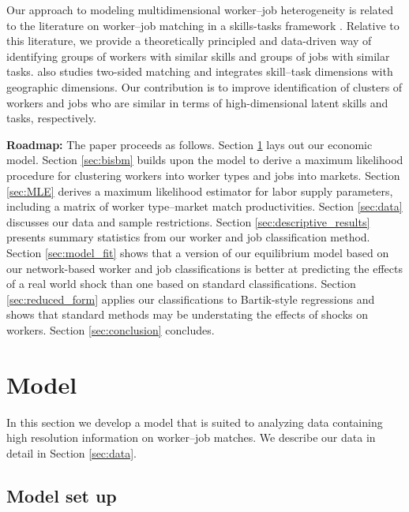 \documentclass[12pt]{article}
\theoremstyle{definition}
\theoremstyle{plain}
\begin{document}
Our approach to modeling multidimensional worker--job heterogeneity is related to the literature on worker--job matching in a skills-tasks framework \citep{AutorLevyMurnane2003,AcemogluAutor2011,Autor2013,Lindenlaub2017,Tan2018,Kantenga2018}. Relative to this literature, we provide a theoretically principled and data-driven way of identifying groups of workers with similar skills and groups of jobs with similar tasks. \citet{Mansfield2019} also studies two-sided matching and integrates skill--task dimensions with geographic dimensions.  Our contribution is to improve identification of clusters of workers and jobs who are similar in terms of high-dimensional latent skills and tasks, respectively.

\textbf{Roadmap:} The paper proceeds as follows.  Section \ref{sec:model} lays out our economic model. Section \ref{sec:bisbm} builds upon the model to derive a maximum likelihood procedure for clustering workers into worker types and jobs into markets. Section \ref{sec:MLE} derives a maximum likelihood estimator for labor supply parameters, including a matrix of worker type--market match productivities. Section \ref{sec:data} discusses our data and sample restrictions. Section \ref{sec:descriptive_results} presents summary statistics from our worker and job classification method. Section \ref{sec:model_fit} shows that a version of our equilibrium model based on our network-based worker and job classifications is better at predicting the effects of a real world shock than one based on standard classifications. Section \ref{sec:reduced_form} applies our classifications to Bartik-style regressions and shows that standard methods may be understating the effects of shocks on workers. Section \ref{sec:conclusion} concludes.




\section{Model}
\label{sec:model}


In this section we develop a model that is suited to analyzing data containing high resolution information on worker--job matches. We describe our data in detail in Section \ref{sec:data}. 

\subsection{Model set up}
\end{document}
